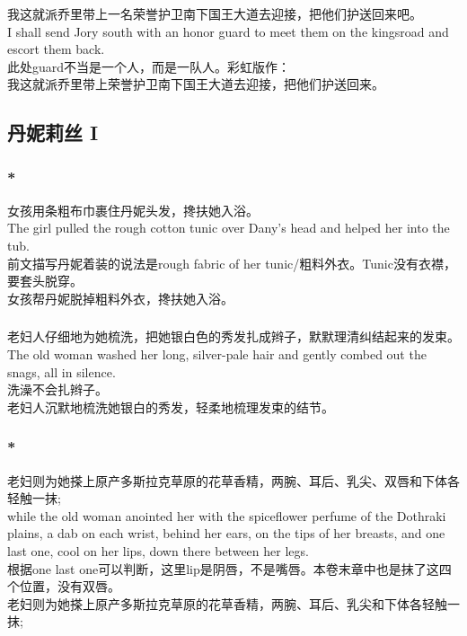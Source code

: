 \documentclass[12pt,a4paper]{article}
\newcommand{\h}[1]{{\color{red}#1}\\}
\newcommand{\la}[1]{{\color{blue}#1}\\}
\begin{document}
	
\subsubsection{}{\color{blue}
我这就派乔里带上一名荣誉护卫南下国王大道去迎接，把他们护送回来吧。\\
I shall send Jory south with an honor guard to meet them on the kingsroad and escort them back.}\\
{\color{red}此处guard不当是一个人，而是一队人。彩虹版作：}\\
我这就派乔里带上荣誉护卫南下国王大道去迎接，把他们护送回来。
	
\subsection{丹妮莉丝 I}	
\subsubsection{\color{red}*}
\la{女孩用条粗布巾裹住丹妮头发，搀扶她入浴。\\
The girl pulled the rough cotton tunic over Dany's head and helped her into the tub.} 
\h{前文描写丹妮着装的说法是rough fabric of her tunic/粗料外衣。Tunic没有衣襟，要套头脱穿。}
女孩帮丹妮脱掉粗料外衣，搀扶她入浴。
				
		
\subsubsection{}
	\la{老妇人仔细地为她梳洗，把她银白色的秀发扎成辫子，默默理清纠结起来的发束。\\
	The old woman washed her long, silver-pale hair and gently combed out the snags, all in silence.}
\h{	洗澡不会扎辫子。}
	老妇人沉默地梳洗她银白的秀发，轻柔地梳理发束的结节。
	
\subsubsection{\color{red}*}
	\la{老妇则为她搽上原产多斯拉克草原的花草香精，两腕、耳后、乳尖、双唇和下体各轻触一抹;\\
	while the old woman anointed her with the spiceflower perfume of the Dothraki plains, a dab on each wrist, behind her ears, on the tips of her breasts, and one last one, cool on her lips, down there between her legs. }
\h{	根据one last one可以判断，这里lip是阴唇，不是嘴唇。本卷末章中也是抹了这四个位置，没有双唇。}
	老妇则为她搽上原产多斯拉克草原的花草香精，两腕、耳后、乳尖和下体各轻触一抹;
\end{document}
